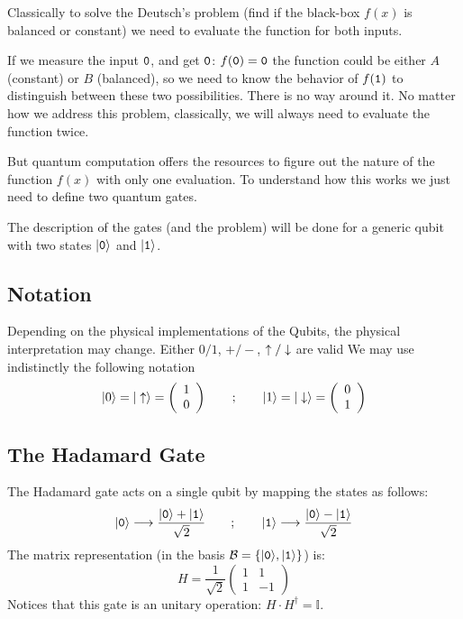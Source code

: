 Classically to solve the Deutsch's problem (find if the black-box $f(x)$ is balanced or constant) we need to evaluate the function for both inputs.

If we measure the input $\texttt{0}$, and get $\texttt{0}$: $f(\texttt{0})=\texttt{0}$ the function could be either $A$ (constant) or $B$ (balanced), so we need to know the behavior of $f(\texttt{1})$ to distinguish between these two possibilities.
There is no way around it. No matter how we address this problem, classically, we will always need to evaluate the function twice.

But quantum computation offers the resources to figure out the nature of the function $f(x)$ with only one evaluation. To understand how this works we just need to define two quantum gates.

The description of the gates (and the problem) will be done for a generic qubit with two states $|\texttt{0}\rangle$ and $|\texttt{1}\rangle$.

\subsection{Notation}
Depending on the physical implementations of the Qubits, the physical interpretation may change. Either $0/1$, $+/-$, $\uparrow/\downarrow$ are valid We may use indistinctly the following notation
\begin{equation}
  |0\rangle = |\uparrow\rangle =
  \left(\begin{array}{c}
        1 \\
        0
        \end{array}\right)
\qquad;\qquad
  |1\rangle = |\downarrow\rangle =
  \left(\begin{array}{c}
        0 \\
        1
        \end{array}\right)
\end{equation}



\subsection{The Hadamard Gate}
The Hadamard gate acts on a single qubit by mapping the states as follows:
\begin{equation}
  |\texttt{0}\rangle \longrightarrow \frac{|\texttt{0}\rangle+|\texttt{1}\rangle}{\sqrt{2}}
  \qquad;\qquad
  |\texttt{1}\rangle \longrightarrow \frac{|\texttt{0}\rangle-|\texttt{1}\rangle}{\sqrt{2}}
\label{Hmap}
\end{equation}
The matrix representation (in the basis $\mathcal{B}=\left\{|\texttt{0}\rangle,|\texttt{1}\rangle\right\}$) is:
\begin{equation}
  H=\frac{1}{\sqrt{2}}\left(\begin{array}{cc}
  1 & 1 \\
  1 & -1
  \end{array}\right)
\label{hadamard}
\end{equation}
Notices that this gate is an unitary operation: $H\cdot H^{\dagger}=\mathbb{I}$.

